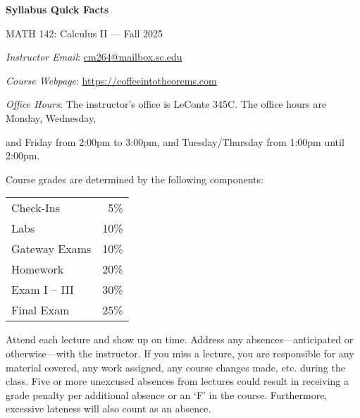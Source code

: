 \documentclass[11pt,letterpaper]{article}
\begin{document}
\begin{center} 
\bfseries
\color{scred}
\LARGE Syllabus Quick Facts \par\vspace{0.2\baselineskip}
\Large MATH 142: Calculus II --- Fall 2025
\end{center} \pspace


\hspace{0.53cm} {\itshape Instructor Email}: \href{mailto:cm264@mailbox.sc.edu}{cm264@mailbox.sc.edu} \par
\hspace{0.53cm} {\itshape Course Webpage}: \href{https://coffeeintotheorems.com}{https://coffeeintotheorems.com} \par
\hspace{0.53cm} {\itshape Office Hours}: The instructor's office is LeConte 345C. The office hours are Monday, Wednesday, \par \hspace{0.55cm} and Friday from 2:00pm to 3:00pm, and Tuesday/Thursday from 1:00pm until 2:00pm. \pspace


Course grades are determined by the following components: \par \vspace{-0.3cm}
	\begin{table}[!ht]
        \begin{tabular}{lr}
	Check-Ins & 5\% \\
	Labs & 10\% \\
	Gateway Exams& 10\% \\
	Homework & 20\% \\
	Exam I -- III & 30\% \\
	Final Exam & 25\%
        \end{tabular} 
        \end{table}


Attend each lecture and show up on time. Address any absences---anticipated or otherwise---with the instructor. If you miss a lecture, you are responsible for any material covered, any work assigned, any course changes made, etc. during the class. Five or more unexcused absences from lectures could result in receiving a grade penalty per additional absence or an `F' in the course. Furthermore, excessive lateness will also count as an absence. 
\pspace
\end{document}
